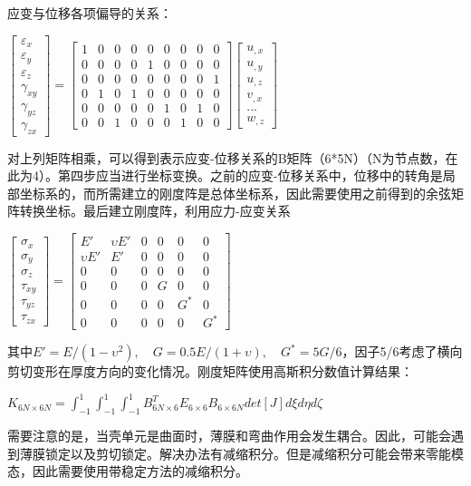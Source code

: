 \documentclass[forprint]{WHUBachelor}
\begin{document}
应变与位移各项偏导的关系：
\begin{center}
$\left[\begin{matrix}
\varepsilon_x\\\varepsilon_y\\\varepsilon_z\\\gamma_{xy}\\\gamma_{yz}\\\gamma_{zx}
\end{matrix}\right]=\left[\begin{matrix}
1&0&0&0&0&0&0&0&0\\
0&0&0&0&1&0&0&0&0\\
0&0&0&0&0&0&0&0&1\\
0&1&0&1&0&0&0&0&0\\
0&0&0&0&0&1&0&1&0\\
0&0&1&0&0&0&1&0&0
\end{matrix}\right]\left[\begin{matrix}
u_{,x}\\u_{,y}\\u_{,z}\\v_{,x}\\...\\w_{,z}
\end{matrix}\right]$
\end{center}
对上列矩阵相乘，可以得到表示应变-位移关系的B矩阵（6*5N）（N为节点数，在此为4）。第四步应当进行坐标变换。之前的应变-位移关系中，位移中的转角是局部坐标系的，而所需建立的刚度阵是总体坐标系，因此需要使用之前得到的余弦矩阵转换坐标。最后建立刚度阵，利用应力-应变关系
\begin{center}
$\left[\begin{matrix}
\sigma_x\\\sigma_y\\\sigma_z\\\tau_{xy}\\\tau_{yz}\\\tau_{zx}
\end{matrix}\right]=\left[\begin{matrix}
E'&\upsilon E'&0&0&0&0\\
\upsilon E'&E'&0&0&0&0\\
0&0&0&0&0&0\\
0&0&0&G&0&0\\
0&0&0&0&G^*&0\\
0&0&0&0&0&G^*
\end{matrix}\right]$
\end{center}
其中$E'=E/(1-\upsilon^2),\quad G=0.5E/(1+\upsilon),\quad G^*=5G/6$，因子5/6考虑了横向剪切变形在厚度方向的变化情况。刚度矩阵使用高斯积分数值计算结果：
\begin{center}
$K_{6N\times 6N}=\int_{-1}^1\int_{-1}^1\int_{-1}^1 B^T_{6N\times 6}E_{6\times 6}B_{6\times 6N}det[J]d\xi d\eta d\zeta$
\end{center}
需要注意的是，当壳单元是曲面时，薄膜和弯曲作用会发生耦合。因此，可能会遇到薄膜锁定以及剪切锁定。解决办法有减缩积分。但是减缩积分可能会带来零能模态，因此需要使用带稳定方法的减缩积分。
\end{document}
